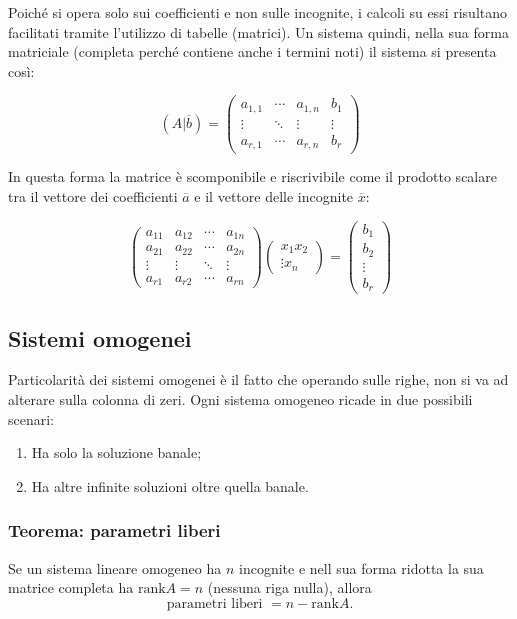\documentclass[x11names]{article}
\begin{document}
Poiché si opera solo sui coefficienti e non sulle incognite, i calcoli su essi risultano facilitati tramite l'utilizzo di tabelle (matrici). Un sistema quindi, nella sua forma matriciale (completa perché contiene anche i termini noti) il sistema si presenta così:

\[
\left(A|\overline{b}\right)=
\left(\begin{array}{ccc|c}
a_{1,1}&\cdots &a_{1,n}&b_{1} \\ \vdots &\ddots &\vdots  &\vdots \\ a_{r,1}&\cdots &a_{r,n}&b_{r}
\end{array}\right)
\] 

In questa forma la matrice è scomponibile e riscrivibile come il prodotto scalare tra il vettore dei coefficienti $\overline{a}$ e il vettore delle incognite $\overline{x}$:

\[
\begin{pmatrix}
a_{11}&a_{12}&\cdots &a_{1n}\\
a_{21}&a_{22}&\cdots &a_{2n}\\
\vdots &\vdots &\ddots &\vdots\\ 
a_{r1}&a_{r2}&\cdots &a_{rn}
\end{pmatrix}
\begin{pmatrix}x_{1}x_{2}\\
\vdots x_{n}
\end{pmatrix}=
\begin{pmatrix}
b_{1} \\
b_{2} \\
\vdots\\ 
b_{r}
\end{pmatrix}
\]

\subsection{Sistemi omogenei}
Particolarità dei sistemi omogenei è il fatto che operando sulle righe, non si va ad alterare sulla colonna di zeri. Ogni sistema omogeneo ricade in due possibili scenari:

\begin{enumerate}
 	\item Ha solo la soluzione banale;
	 \item Ha altre infinite soluzioni oltre quella banale.
\end{enumerate}


\begin{center}
\colorbox{myred}{\begin{minipage}{5.75in}
\begin{redes}{}
\subsubsection{Teorema: parametri liberi}
Se un sistema lineare omogeneo ha $n$ incognite e nell sua forma ridotta la sua matrice completa ha  $\text{rank}A = n$ (nessuna riga nulla), allora
\[
\text{parametri liberi } = n - \text{rank}A
.\] 
\end{redes}
\end{minipage}}        
\end{center}
\end{document}
